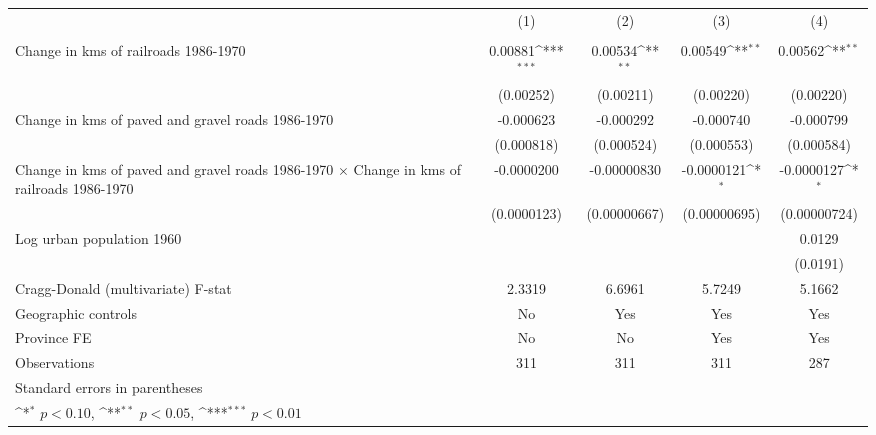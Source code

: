 {
\def\sym#1{\ifmmode^{#1}\else\(^{#1}\)\fi}
\begin{tabular}{l*{4}{c}}
\hline\hline
                &\multicolumn{1}{c}{(1)}&\multicolumn{1}{c}{(2)}&\multicolumn{1}{c}{(3)}&\multicolumn{1}{c}{(4)}\\
                &\multicolumn{1}{c}{}&\multicolumn{1}{c}{}&\multicolumn{1}{c}{}&\multicolumn{1}{c}{}\\
\hline
Change in kms of railroads 1986-1970&  0.00881\sym{***}&  0.00534\sym{**} &  0.00549\sym{**} &  0.00562\sym{**} \\
                &(0.00252)         &(0.00211)         &(0.00220)         &(0.00220)         \\
[1em]
Change in kms of paved and gravel roads 1986-1970&-0.000623         &-0.000292         &-0.000740         &-0.000799         \\
                &(0.000818)         &(0.000524)         &(0.000553)         &(0.000584)         \\
[1em]
Change in kms of paved and gravel roads 1986-1970 $\times$ Change in kms of railroads 1986-1970&-0.0000200         &-0.00000830         &-0.0000121\sym{*}  &-0.0000127\sym{*}  \\
                &(0.0000123)         &(0.00000667)         &(0.00000695)         &(0.00000724)         \\
[1em]
Log urban population 1960&                  &                  &                  &   0.0129         \\
                &                  &                  &                  & (0.0191)         \\
\hline
Cragg-Donald (multivariate) F-stat&   2.3319         &   6.6961         &   5.7249         &   5.1662         \\
Geographic controls&       No         &      Yes         &      Yes         &      Yes         \\
Province FE     &       No         &       No         &      Yes         &      Yes         \\
Observations    &      311         &      311         &      311         &      287         \\
\hline\hline
\multicolumn{5}{l}{\footnotesize Standard errors in parentheses}\\
\multicolumn{5}{l}{\footnotesize \sym{*} \(p<0.10\), \sym{**} \(p<0.05\), \sym{***} \(p<0.01\)}\\
\end{tabular}
}

